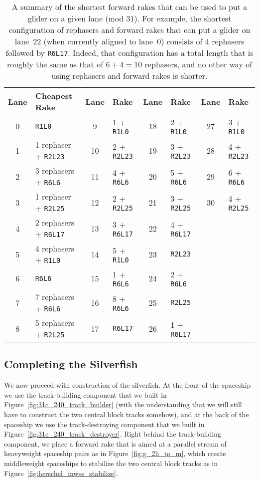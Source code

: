 \begin{table}[!htbp]
	\centering
	\begin{tabular}{c l | c l | c l | c l}
		\toprule
		Lane & Cheapest Rake & Lane & Rake & Lane & Rake & Lane & Rake \\ \midrule
		0 & \texttt{R1L0} & 9 & 1 + \texttt{R1L0} & 18 & 2 + \texttt{R1L0} & 27 & 3 + \texttt{R1L0} \\
		1 & 1 rephaser + \texttt{R2L23} & 10 & 2 + \texttt{R2L23} & 19 & 3 + \texttt{R2L23} & 28 & 4 + \texttt{R2L23}\\
		2 & 3 rephasers + \texttt{R6L6} & 11 & 4 + \texttt{R6L6} & 20 & 5 + \texttt{R6L6} & 29 & 6 + \texttt{R6L6} \\
		3 & 1 rephaser + \texttt{R2L25} & 12 & 2 + \texttt{R2L25} & 21 & 3 + \texttt{R2L25} & 30 & 4 + \texttt{R2L25} \\
		4 & 2 rephasers + \texttt{R6L17} & 13 & 3 + \texttt{R6L17} & 22 & 4 + \texttt{R6L17} & & \\
		5 & 4 rephasers + \texttt{R1L0} & 14 & 5 + \texttt{R1L0} & 23 & \texttt{R2L23} & & \\
		6 & \texttt{R6L6} & 15 & 1 + \texttt{R6L6} & 24 & 2 + \texttt{R6L6} & & \\
		7 & 7 rephasers + \texttt{R6L6} & 16 & 8 + \texttt{R6L6} & 25 & \texttt{R2L25} & & \\
		8 & 5 rephasers + \texttt{R2L25} & 17 & \texttt{R6L17} & 26 & 1 + \texttt{R6L17} & & \\
		\bottomrule
	\end{tabular}
	\caption{A summary of the shortest forward rakes that can be used to put a glider on a given lane (mod $31$). For example, the shortest configuration of rephasers and forward rakes that can put a glider on lane~22 (when currently aligned to lane~0) consists of 4 rephasers followed by \texttt{R6L17}. Indeed, that configuration has a total length that is roughly the same as that of $6 + 4 = 10$ rephasers, and no other way of using rephasers and forward rakes is shorter.}\label{tab:silverfish_forward_rakes}
\end{table}


\subsection{Completing the Silverfish}\label{sec:silverfish_completed}

We now proceed with construction of the silverfish. At the front of the spaceship we use the track-building component that we built in Figure~\ref{fig:31c_240_track_builder} (with the understanding that we will still have to construct the two central block tracks somehow), and at the back of the spaceship we use the track-destroying component that we built in Figure~\ref{fig:31c_240_track_destroyer}. Right behind the track-building component, we place a forward rake that is aimed at a parallel stream of heavyweight spaceship pairs as in Figure~\ref{fig:g_2h_to_m}, which create middleweight spaceships to stabilize the two central block tracks as in Figure~\ref{fig:herschel_mwss_stabilize}.

